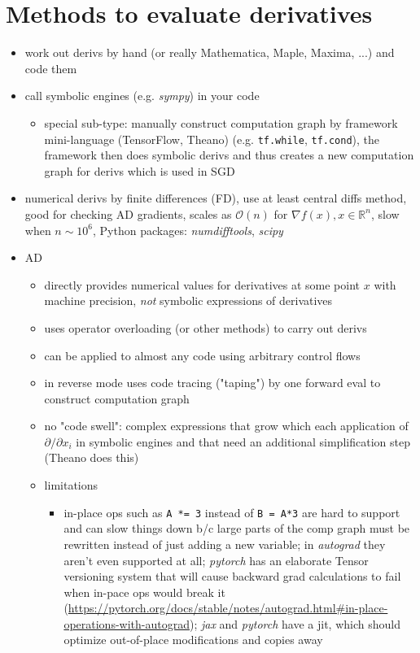 \documentclass[paper=a4,11pt,headsepline]{scrartcl}
\newcommand{\ve}[1]{\ensuremath{\bm{\mathit{#1}}}}
\newcommand{\soft}[1]{\textsl{#1}\xspace}
\newcommand{\pytorch}{\soft{pytorch}}
\newcommand{\jax}{\soft{jax}}
\newcommand{\autograd}{\soft{autograd}}
\newcommand{\scipy}{\soft{scipy}}
\newcommand{\numdifftools}{\soft{numdifftools}}
\newcommand{\co}[1]{\texttt{#1}}
\begin{document}
\section{Methods to evaluate derivatives}

\begin{itemize}
    \item work out derivs by hand (or really Mathematica, Maple, Maxima, ...)
        and code them
    \item call symbolic engines (e.g. \soft{sympy}) in your code
    \begin{itemize}
        \item special sub-type: manually construct computation graph by
            framework mini-language (TensorFlow, Theano) (e.g. \co{tf.while},
            \co{tf.cond}), the framework then does symbolic derivs and thus
            creates a new computation graph for derivs which is used in SGD
    \end{itemize}
\item numerical derivs by finite differences (FD), use at least central diffs method,
    good for checking AD gradients, scales as $\mathcal
    O(n)$ for $\nabla f(\ve x), \ve x\in\mathbb R^n$, slow when $n\sim 10^6$,
    Python packages: \numdifftools, \scipy
\item AD
    \begin{itemize}
        \item directly provides numerical values for derivatives at some point
            $\ve x$ with machine precision, \emph{not} symbolic expressions of
            derivatives
        \item uses operator overloading (or other methods) to carry out derivs
        \item can be applied to almost any code using arbitrary control flows
        \item in reverse mode uses code tracing ("taping") by one forward eval
            to construct computation graph
        \item no "code swell": complex expressions that grow which each
            application of $\partial/\partial x_i$ in symbolic engines and that
            need an additional simplification step (Theano does this)
        \item limitations
        \begin{itemize}
            \item in-place ops such as \co{A *= 3} instead of
                \co{B = A*3} are hard to support and can slow things down b/c
                large parts of the comp graph must be rewritten instead of just
                adding a new variable; in \autograd they aren't even supported
                at all;  \pytorch has an elaborate Tensor versioning system
                that will cause backward grad calculations to fail
                when in-pace ops would break it
                (\url{https://pytorch.org/docs/stable/notes/autograd.html#in-place-operations-with-autograd});
                \jax and \pytorch have a jit, which should optimize
                out-of-place modifications and copies away
        \end{itemize}
    \end{itemize}
\end{itemize}
%
\end{document}
